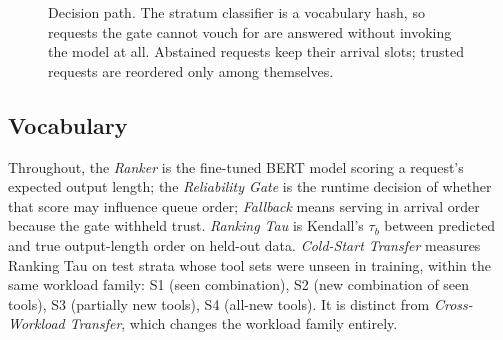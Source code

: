 \begin{figure}[t]
  \centering
  \caption{Decision path. The stratum classifier is a vocabulary hash, so
  requests the gate cannot vouch for are answered without invoking the model at
  all. Abstained requests keep their arrival slots; trusted requests are
  reordered only among themselves.}
  \label{fig:components}
\end{figure}

\subsection{Vocabulary}
Throughout, the \emph{Ranker} is the fine-tuned BERT model scoring a
request's expected output length; the \emph{Reliability Gate} is the runtime
decision of whether that score may influence queue order; \emph{Fallback}
means serving in arrival order because the gate withheld trust.
\emph{Ranking Tau} is Kendall's $\tau_b$ between predicted and true
output-length order on held-out data. \emph{Cold-Start Transfer} measures
Ranking Tau on test strata whose tool sets were unseen in training, within
the same workload family: S1 (seen combination), S2 (new combination of seen
tools), S3 (partially new tools), S4 (all-new tools). It is distinct from
\emph{Cross-Workload Transfer}, which changes the workload family entirely.

